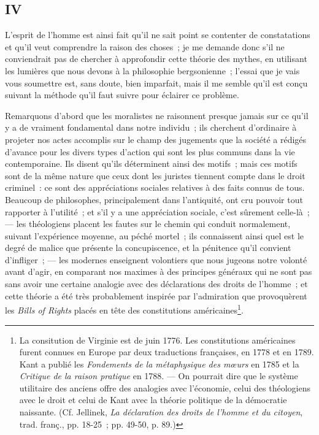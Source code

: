 \documentclass[french,twoside]{book} %
\begin{document}
\subsection[{IV}]{IV}
\noindent L’esprit de l’homme est ainsi fait qu’il ne sait point se contenter de constatations et qu’il veut comprendre la raison des choses ; je me demande donc s’il ne conviendrait pas de chercher à approfondir cette théorie des mythes, en utilisant les lumières que nous devons à la  philosophie bergsonienne ; l’essai que je vais vous soumettre est, sans doute, bien imparfait, mais il me semble qu’il est conçu suivant la méthode qu’il faut suivre pour éclairer ce problème.\par
Remarquons d’abord que les moralistes ne raisonnent presque jamais sur ce qu’il y a de vraiment fondamental dans notre individu ; ils cherchent d’ordinaire à projeter nos actes accomplis sur le champ des jugements que la société a rédigés d’avance pour les divers types d’action qui sont les plus communs dans la vie contemporaine. Ils disent qu’ils déterminent ainsi des motifs ; mais ces motifs sont de la même nature que ceux dont les juristes tiennent compte dans le droit criminel : ce sont des appréciations sociales relatives à des faits connus de tous. Beaucoup de philosophes, principalement dans l’antiquité, ont cru pouvoir tout rapporter à l’utilité ; et s’il y a une appréciation sociale, c’est sûrement celle-là ; — les théologiens placent les fautes sur le chemin qui conduit normalement, suivant l’expérience moyenne, au péché mortel ; ils connaissent ainsi quel est le degré de malice que présente la concupiscence, et la pénitence qu’il convient d’infliger ; — les modernes enseignent volontiers que nous jugeons notre volonté avant d’agir, en comparant nos maximes à des principes généraux qui ne sont pas sans avoir une certaine analogie avec des déclarations des droits de l’homme ; et cette théorie a été très probablement inspirée par l’admiration que provoquèrent les \emph{Bills of Rights} placés en tête des constitutions américaines\footnote{ \noindent La consitution de Virginie est de juin 1776. Les constitutions américaines furent connues en Europe par deux traductions françaises, en 1778 et en 1789. Kant a publié les \emph{Fondements de la métaphysique des mœurs} en 1785 et la \emph{Critique de la raison pratique} en 1788. — On pourrait dire que le système utilitaire des anciens offre des analogies avec l’économie, celui des théologiens avec le droit et celui de Kant avec la théorie politique de la démocratie naissante. (Cf. Jellinek, \emph{La déclaration des droits de l’homme et du citoyen}, trad. franç., pp. 18-25 ; pp. 49-50, p. 89.)
 }.\par
\end{document}
